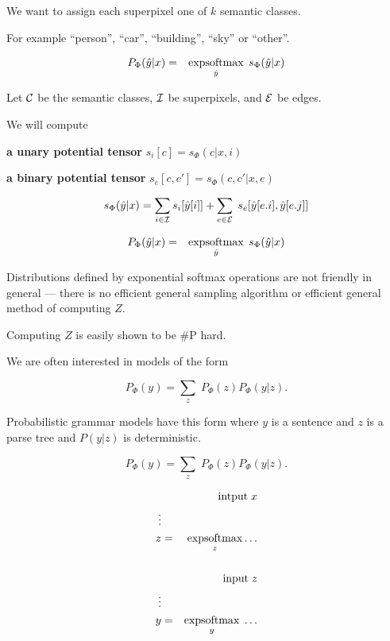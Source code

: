{\vfill
We want to assign each superpixel one of $k$ semantic classes.

\vfill
For example ``person'', ``car'', ``building'', ``sky'' or ``other''.

\bigskip
{\color{red}
\begin{eqnarray*}
P_\Phi(\hat{y}|x) & = & \operatorname*{expsoftmax}_{\hat{y}}\;s_\Phi(\hat{y}|x)
\end{eqnarray*}
}

\vfill
Let ${\cal C}$ be the semantic classes, ${\cal I}$ be superpixels, and ${\cal E}$ be edges.

\vfill
We will compute

\vfill {\bf a unary potential tensor} $s_i[c] = s_\Phi(c|x,i)$

\vfill
{\bf a binary potential tensor} $s_e[c,c'] = s_\Phi(c,c'|x,e)$

\vfill
{\color{red} $$s_\Phi(\hat{y}|x) = \sum_{i \in {\cal I}} s_i[\hat{y}[i]] + \sum_{e \in {\cal E}}\;s_e[\hat{y}[e.i],\hat{y}[e.j]]$$}

\bigskip
{\color{red}
\begin{eqnarray*}
P_\Phi(\hat{y}|x) & = & \operatorname*{expsoftmax}_{\hat{y}}\;s_\Phi(\hat{y}|x)
\end{eqnarray*}
}

\vfill
Distributions defined by exponential softmax operations are not friendly in general --- there is no efficient general sampling algorithm or efficient general method of computing $Z$.

\vfill
Computing $Z$ is easily shown to be \#P hard.


We are often interested in models of the form

\vfill
{\color{red} $$P_\Phi(y) = \sum_z\;P_\Phi(z)P_\Phi(y|z).$$}

\vfill
Probabilistic grammar models have this form where $y$ is a sentence and $z$ is a parse tree
and $P(y|z)$ is deterministic.


$$P_\Phi(y) = \sum_z\;P_\Phi(z)P_\Phi(y|z).$$

\vfill
{\color{red}
\begin{eqnarray*}
& & \mbox{intput}\; x \\
\vdots \\
z & = & \operatorname*{expsoftmax}_z \ldots \\
\\
& & \mbox{input}\; z \\
\vdots \\
y & = & \operatorname*{expsoftmax}_y\;\ldots
\end{eqnarray*}
}

}
